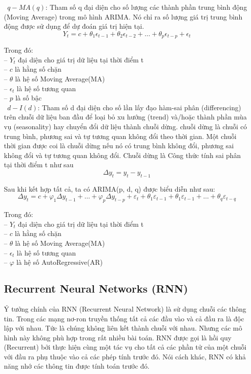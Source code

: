 \documentclass[conference]{IEEEtran}
\begin{document}
\indent\textbullet\ \(q-MA(q)\): Tham số q đại diện cho số lượng các thành phần trung bình động (Moving Average) trong mô hình ARIMA. Nó chỉ ra số lượng giá trị trung bình động được sử dụng để dự đoán giá trị hiện tại.\\
\[
    Y_t = c + \theta_1 \epsilon_{t-1} + \theta_2 \epsilon_{t-2} + \ldots + \theta_p \epsilon_{t-p} + \epsilon_t
\]

Trong đó: \\
\indent -- \(Y_t\) đại diện cho giá trị dữ liệu tại thời điểm t\\
\indent -- \(c\) là hằng số chặn\\
\indent -- \(\theta\) là hệ số Moving Average(MA)\\
\indent -- \(\epsilon_t\) là hệ số tương quan\\
\indent -- \(p\) là số bậc \\

\indent\textbullet\  \(d-I(d)\): Tham số d đại diện cho số lần lấy đạo hàm-sai phân (differencing) trên chuỗi dữ liệu ban đầu để loại bỏ xu hướng (trend) và/hoặc thành phần mùa vụ (seasonality) hay chuyển đổi dữ liệu thành chuỗi dừng. chuỗi dừng là chuỗi có trung bình, phương sai và tự tương quan không đổi theo thời gian. Một chuỗi thời gian được coi là chuỗi dừng nếu nó có trung bình không đổi, phương sai không đổi và tự tương quan không đổi. Chuỗi dừng là Công thức tính sai phân tại thời điểm t như sau
\[
    \Delta y_t = y_t - y_{t-1}
\]

Sau khi kết hợp tất cả, ta có ARIMA(p, d, q) được biểu diễn như sau:
\[
    \Delta y_t = c + \varphi_1 \Delta y_{t-1} + \ldots + \varphi_p \Delta y_{t-p} + \varepsilon_t + \theta_1 \varepsilon_{t-1} + \theta_1 \varepsilon_{t-1} + \ldots + \theta_q \varepsilon_{t-q}
\]

Trong đó: \\
\indent -- \(Y_t\) đại diện cho giá trị dữ liệu tại thời điểm t\\
\indent -- \(c\) là hằng số chặn\\
\indent -- \(\theta\) là hệ số Moving Average(MA)\\
\indent -- \(\epsilon_t\) là hệ số tương quan\\
\indent -- \(\varphi\) là hệ số AutoRegressive(AR)\\


\subsection{Recurrent Neural Networks (RNN)}
Ý tưởng chính của RNN (Recurrent Neural Network) là sử dụng chuỗi các thông tin. Trong các mạng nơ-ron truyền thống tất cả các đầu vào và cả đầu ra là độc lập với nhau. Tức là chúng không liên kết thành chuỗi với nhau. Nhưng các mô hình này không phù hợp trong rất nhiều bài toán. RNN được gọi là hồi quy (Recurrent) bởi thực hiện cùng một tác vụ cho tất cả các phần tử của một chuỗi với đầu ra phụ thuộc vào cả các phép tính trước đó. Nói cách khác, RNN có khả năng nhớ các thông tin được tính toán trước đó.
\end{document}
